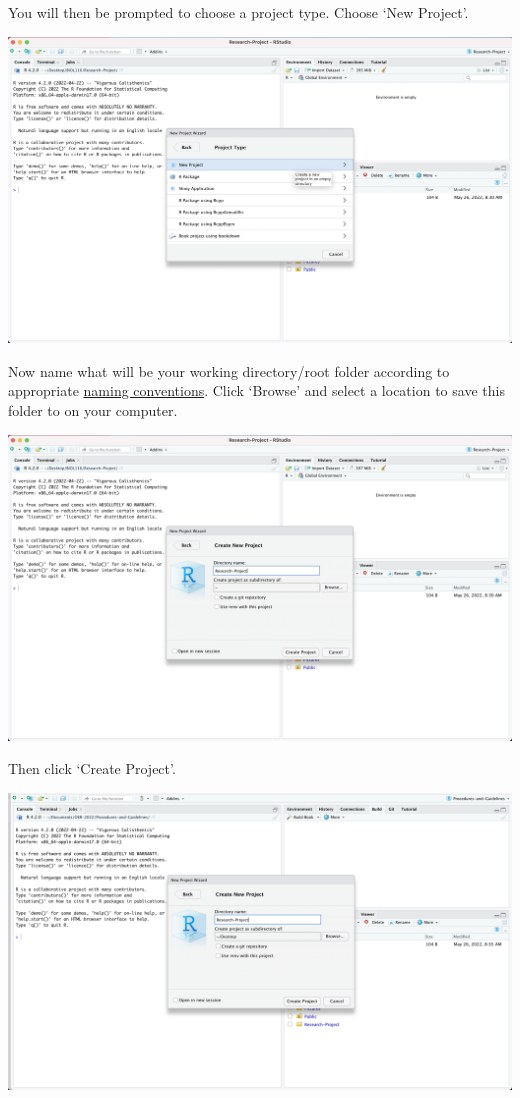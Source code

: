 \documentclass[
]{book}
\begin{document}
You will then be prompted to choose a project type. Choose `New Project'.

\includegraphics{images/D_new-project-in-new-folder-3.png}

Now name what will be your working directory/root folder according to appropriate \href{https://ubco-biology.github.io/Procedures-and-Guidelines/directory-naming}{naming conventions}. Click `Browse' and select a location to save this folder to on your computer.

\includegraphics{images/D_new-project-in-new-folder-4.png}

Then click `Create Project'.

\includegraphics{images/D_new-project-in-new-folder-5.png}
\end{document}
